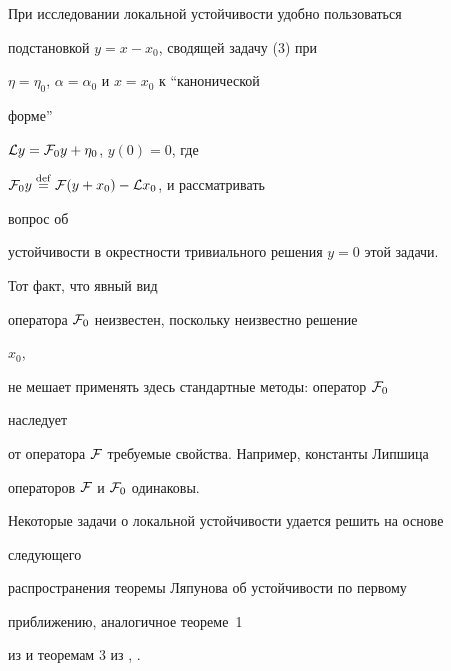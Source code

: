 При исследовании локальной устойчивости удобно пользоваться


подстановкой $y=x-x_0$, сводящей задачу (3) при


$\eta=\eta_0$, $\alpha=\alpha_0$ и $x=x_0$ к ``канонической


форме''


${\cal L}y={\cal F}_0y+\eta_0$, $y(0)=0$, где


${\cal F}_0y\overset{\mathrm{def}}{=}{}{\cal F}(y+x_0)-{\cal L}x_0$, и рассматривать


вопрос об


устойчивости в окрестности тривиального решения $y=0$ этой задачи.





Тот факт, что явный вид


оператора ${\cal F}_0$ неизвестен, поскольку неизвестно решение


$x_0$,


не мешает применять здесь стандартные методы: оператор ${\cal F}_0$


наследует


от оператора $\cal F$ требуемые свойства. Например, константы Липшица


операторов $\cal F$ и ${\cal F}_0$ одинаковы.





Некоторые задачи о локальной устойчивости удается решить на основе


следующего


распространения теоремы Ляпунова об устойчивости по первому


приближению, аналогичное теореме~1


из \cite{7} и теоремам 3 из \cite{8}, \cite{9}.





